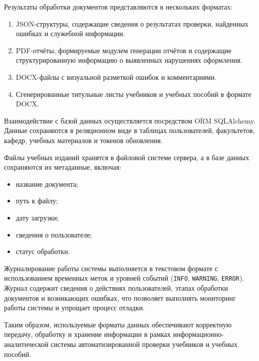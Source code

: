 Результаты обработки документов представляются в нескольких форматах:
\begin{enumerate}
	\item JSON-структуры, содержащие сведения о результатах проверки, найденных ошибках и служебной информации.
	
	\item PDF-отчёты, формируемые модулем генерации отчётов и содержащие структурированную информацию о выявленных нарушениях оформления.
	
	\item DOCX-файлы с визуальной разметкой ошибок и комментариями.
	
	\item Сгенерированные титульные листы учебников и учебных пособий в формате DOCX.
\end{enumerate}

Взаимодействие с базой данных осуществляется посредством ORM SQLAlchemy. Данные сохраняются в реляционном виде в таблицах пользователей, факультетов, кафедр, учебных материалов и токенов обновления.

Файлы учебных изданий хранятся в файловой системе сервера, а в базе данных сохраняются их метаданные, включая:
\begin{itemize}
	\item название документа;
	\item путь к файлу;
	\item дату загрузки;
	\item сведения о пользователе;
	\item статус обработки.
\end{itemize}

Журналирование работы системы выполняется в текстовом формате с использованием временных меток и уровней событий (\texttt{INFO}, \texttt{WARNING}, \texttt{ERROR}). Журнал содержит сведения о действиях пользователей, этапах обработки документов и возникающих ошибках, что позволяет выполнять мониторинг работы системы и упрощает процесс отладки.

Таким образом, используемые форматы данных обеспечивают корректную передачу, обработку и хранение информации в рамках информационно-аналитической системы автоматизированной проверки учебников и учебных пособий.

